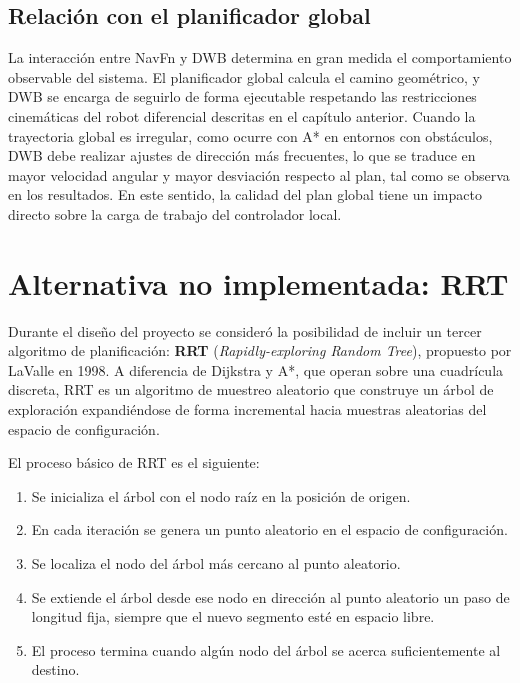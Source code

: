 \subsection{Relación con el planificador global}

La interacción entre NavFn y DWB determina en gran medida el comportamiento observable del sistema. El planificador global calcula el camino geométrico, y DWB se encarga de seguirlo de forma ejecutable respetando las restricciones cinemáticas del robot diferencial descritas en el capítulo anterior. Cuando la trayectoria global es irregular, como ocurre con A* en entornos con obstáculos, DWB debe realizar ajustes de dirección más frecuentes, lo que se traduce en mayor velocidad angular y mayor desviación respecto al plan, tal como se observa en los resultados. En este sentido, la calidad del plan global tiene un impacto directo sobre la carga de trabajo del controlador local.

\section{Alternativa no implementada: RRT}

Durante el diseño del proyecto se consideró la posibilidad de incluir un tercer algoritmo de planificación: \textbf{RRT} (\textit{Rapidly-exploring Random Tree})\cite{lavalle1998}, propuesto por LaValle en 1998. A diferencia de Dijkstra y A*, que operan sobre una cuadrícula discreta, RRT es un algoritmo de muestreo aleatorio que construye un árbol de exploración expandiéndose de forma incremental hacia muestras aleatorias del espacio de configuración.

El proceso básico de RRT es el siguiente:

\begin{enumerate}
    \item Se inicializa el árbol con el nodo raíz en la posición de origen.
    \item En cada iteración se genera un punto aleatorio en el espacio de configuración.
    \item Se localiza el nodo del árbol más cercano al punto aleatorio.
    \item Se extiende el árbol desde ese nodo en dirección al punto aleatorio un paso de longitud fija, siempre que el nuevo segmento esté en espacio libre.
    \item El proceso termina cuando algún nodo del árbol se acerca suficientemente al destino.
\end{enumerate}

